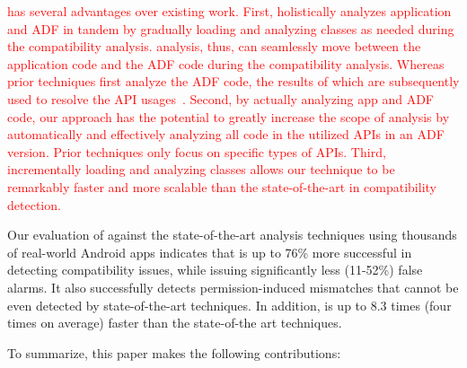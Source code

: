 \textcolor{red}{
\@approach has several advantages over existing work.
First, \@approach holistically analyzes application and
ADF in tandem by gradually loading and analyzing
classes as needed during the compatibility analysis.
\@approach analysis, thus, can seamlessly move between
the application code and the ADF code during the
compatibility analysis.  Whereas prior techniques first
analyze the ADF code, the results of which are
subsequently used to resolve the API
usages~\cite{huang2018understanding,linttips,
lili2018cid}. Second, by actually analyzing app and ADF
code, our approach has the potential to greatly
increase the scope of analysis by automatically and
effectively analyzing all code in the utilized APIs in
an ADF version.  Prior techniques only focus on
specific types of APIs.  Third, incrementally loading
and analyzing classes allows our technique to be
remarkably faster and more scalable than the
state-of-the-art in compatibility detection.  
}

Our evaluation of \@approach against the
state-of-the-art analysis techniques using thousands of
real-world Android apps indicates that 
\@approach is up to 76\% more successful in detecting
compatibility issues, while issuing significantly less
(11-52\%) false alarms.  It also successfully detects
permission-induced mismatches that cannot be even
detected by state-of-the-art techniques.  In addition,
\@approach is  up to 8.3 times (four times on average)
faster than the state-of-the art techniques. 


To summarize,
this paper makes the following contributions:
 
